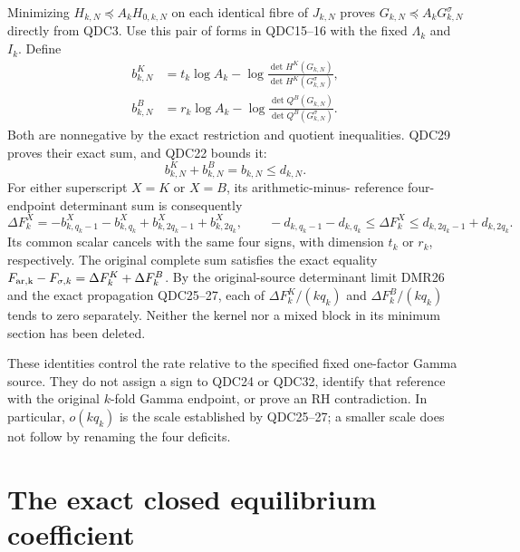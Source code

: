 \documentclass[11pt,a4paper]{article}
\begin{document}
Minimizing $H_{k,N}\preceq A_kH_{0,k,N}$ on each identical
fibre of $J_{k,N}$ proves
$G_{k,N}\preceq A_kG^\sigma_{k,N}$ directly from QDC3.
Use this pair of forms in QDC15--16 with the fixed
$\Lambda_k$ and $I_k$. Define
\[
 \begin{split}
 b^K_{k,N}
 &=t_k\log A_k-
      \log\frac{\det H^K(G_{k,N})}
                    {\det H^K(G^\sigma_{k,N})},\\
 b^B_{k,N}
 &=r_k\log A_k-
      \log\frac{\det Q^B(G_{k,N})}
                    {\det Q^B(G^\sigma_{k,N})}.
 \end{split}
 \tag{QDC30}
\]
Both are nonnegative by the exact restriction and quotient
inequalities. QDC29 proves their exact sum, and QDC22 bounds it:
\[
 b^K_{k,N}+b^B_{k,N}=b_{k,N}\le d_{k,N}.
 \tag{QDC31}
\]
For either superscript $X=K$ or $X=B$, its arithmetic-minus-
reference four-endpoint determinant sum is consequently
\[
 \Delta F^X_k
   =-b^X_{k,q_k-1}-b^X_{k,q_k}
                   +b^X_{k,2q_k-1}+b^X_{k,2q_k},
 \qquad
 -d_{k,q_k-1}-d_{k,q_k}\le\Delta F^X_k
      \le d_{k,2q_k-1}+d_{k,2q_k}.
 \tag{QDC32}
\]
Its common scalar cancels with the same four signs, with
dimension $t_k$ or $r_k$, respectively. The original complete
sum satisfies the exact equality
$F_{\rm ar,k}-F_{\sigma,k}=\Delta F^K_k+\Delta F^B_k$.
By the original-source determinant limit DMR26 and the exact propagation QDC25--27,
each of $\Delta F^K_k/(kq_k)$ and
$\Delta F^B_k/(kq_k)$ tends to zero separately.
Neither the kernel nor a mixed block in its minimum section
has been deleted.

These identities control the rate relative to the specified
fixed one-factor Gamma source. They do not assign a sign to
QDC24 or QDC32, identify that reference with the original
$k$-fold Gamma endpoint, or prove an RH contradiction.
In particular, $o(kq_k)$ is the scale established by
QDC25--27; a smaller scale does not follow by renaming
the four deficits.

\endgroup


\clearpage
\section{The exact closed equilibrium coefficient}
\label{sec:closed-equilibrium-intake}
\end{document}
